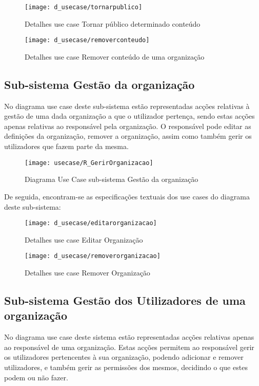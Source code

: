 \documentclass[12pt,a4paper]{article}
\begin{document}
\begin{figure}[h!]
\centering
\texttt{[image: d\_usecase/tornarpublico]}
\label{usecase}
\caption{Detalhes use case Tornar público determinado conteúdo}
\end{figure}

\begin{figure}[h!]
\centering
\texttt{[image: d\_usecase/removerconteudo]}
\label{usecase}
\caption{Detalhes use case Remover conteúdo de uma organização}
\end{figure}


\clearpage
\clearpage
\subsection{Sub-sistema Gestão da organização}
No diagrama use case deste sub-sistema estão representadas acções relativas à gestão de uma dada organização a que o utilizador pertença, sendo estas acções apenas relativas ao responsável pela organização. O responsável pode editar as definições da organização, remover a organização, assim como também gerir os utilizadores que fazem parte da mesma.\\

\begin{figure}[h!]
\centering
\texttt{[image: usecase/R\_GerirOrganizacao]}
\label{usecase}
\caption{Diagrama Use Case sub-sistema Gestão da organização}
\end{figure}

De seguida, encontram-se as especificações textuais dos use cases do diagrama deste sub-sistema:\\

\begin{figure}[h!]
\centering
\texttt{[image: d\_usecase/editarorganizacao]}
\label{usecase}
\caption{Detalhes use case Editar Organização}
\end{figure}

\begin{figure}[h!]
\centering
\texttt{[image: d\_usecase/removerorganizacao]}
\label{usecase}
\caption{Detalhes use case Remover Organização}
\end{figure}

\clearpage

\subsection{Sub-sistema Gestão dos Utilizadores de uma organização}
No diagrama use case deste sistema estão representadas acções relativas apenas ao responsável de uma organização. Estas acções permitem ao responsável gerir os utilizadores pertencentes à sua organização, podendo adicionar e remover utilizadores, e também gerir as permissões dos mesmos, decidindo o que estes podem ou não fazer.\\
\end{document}
